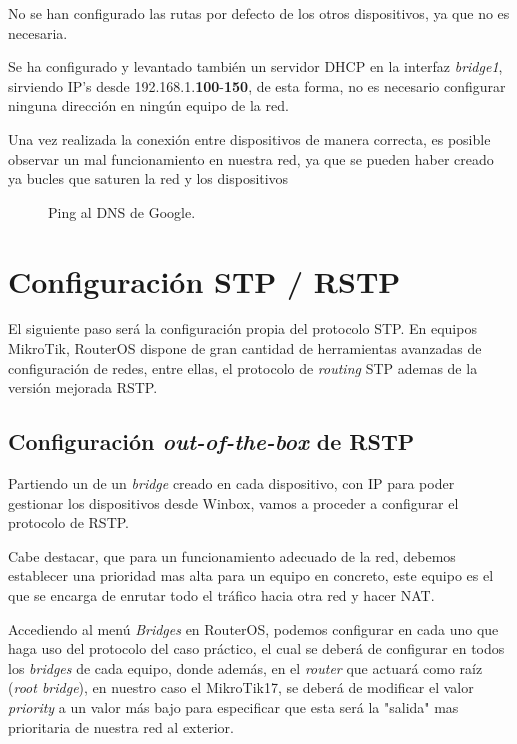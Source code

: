 No se han configurado las rutas por defecto de los otros dispositivos, ya que no es necesaria.

Se ha configurado y levantado también un servidor DHCP en la interfaz \textit{bridge1}, sirviendo IP's desde  192.168.1.\textbf{100}-\textbf{150}, de esta forma, no es necesario configurar ninguna dirección en ningún equipo de la red.

Una vez realizada la conexión entre dispositivos de manera correcta, es posible observar un mal funcionamiento en nuestra red, ya que se pueden haber creado ya bucles que saturen la red y los dispositivos

\begin{figure}[h!]\centering
	\caption{Ping al DNS de Google.}
	\label{ping}
	\bigskip
\end{figure}

\section{Configuración STP / RSTP}

El siguiente paso será la configuración propia del protocolo STP. En equipos MikroTik, RouterOS dispone de gran cantidad de herramientas avanzadas de configuración de redes, entre ellas, el protocolo de \textit{routing} STP ademas de la versión mejorada RSTP.

\subsection{Configuración \textit{out-of-the-box} de RSTP }
\label{box}

Partiendo un de un \textit{bridge} creado en cada dispositivo, con IP para poder gestionar los dispositivos desde Winbox, vamos a proceder a configurar el protocolo de RSTP.

Cabe destacar, que para un funcionamiento adecuado de la red, debemos establecer una prioridad mas alta para un equipo en concreto, este equipo es el que se encarga de enrutar todo el tráfico hacia otra red y hacer NAT. 

Accediendo al menú \textit{Bridges} en RouterOS, podemos configurar en cada uno que haga uso del protocolo del caso práctico, el cual se deberá de configurar en todos los \textit{bridges} de cada equipo, donde además, en el \textit{router} que actuará como raíz (\textit{root bridge}), en nuestro caso el MikroTik17, se deberá de modificar el valor \textit{priority} a un valor más bajo para especificar que esta será la "salida" mas prioritaria de nuestra red al exterior.

